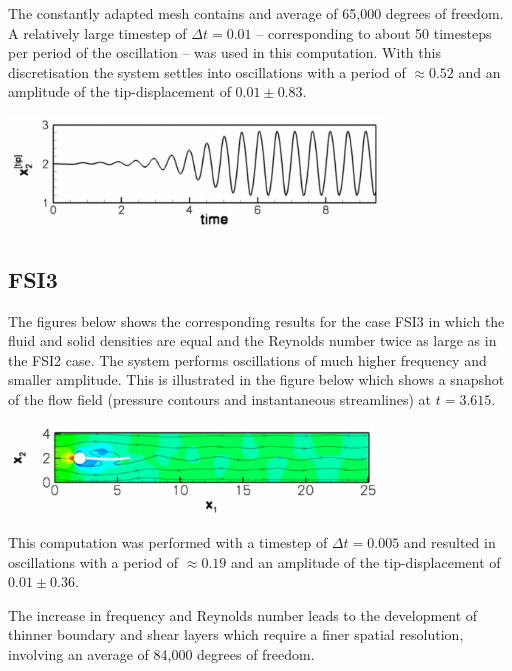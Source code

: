 The constantly adapted mesh contains and average of 65,000 degrees of freedom. A relatively large timestep of $ \Delta t = 0.01 $ -- corresponding to about 50 timesteps per period of the oscillation -- was used in this computation. With this discretisation the system settles into oscillations with a period of $ \approx 0.52 $ and an amplitude of the tip-\/displacement of $ 0.01 \pm 0.83. $

 
\begin{DoxyImage}
\includegraphics[width=0.75\textwidth]{fsi2_trace_cropped}
\end{DoxyImage}
\hypertarget{index_fsi3_results}{}\subsection{F\+S\+I3}\label{index_fsi3_results}
The figures below shows the corresponding results for the case F\+S\+I3 in which the fluid and solid densities are equal and the Reynolds number twice as large as in the F\+S\+I2 case. The system performs oscillations of much higher frequency and smaller amplitude. This is illustrated in the figure below which shows a snapshot of the flow field (pressure contours and instantaneous streamlines) at $ t=3.615. $

 
\begin{DoxyImage}
\includegraphics[width=0.75\textwidth]{fsi3_flow724_cropped}
\end{DoxyImage}


This computation was performed with a timestep of $ \Delta t = 0.005 $ and resulted in oscillations with a period of $ \approx 0.19 $ and an amplitude of the tip-\/displacement of $ 0.01 \pm 0.36. $

The increase in frequency and Reynolds number leads to the development of thinner boundary and shear layers which require a finer spatial resolution, involving an average of 84,000 degrees of freedom.

